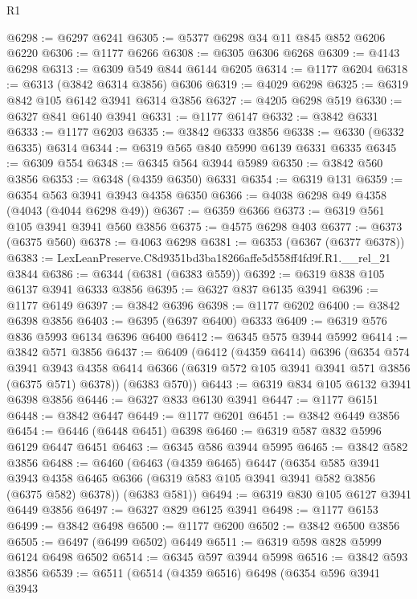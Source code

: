 \begin{lexlean}{R1}
\begin{coremodule}
@6298 := @6297 @6241
@6305 := @5377 @6298 @34 @11 @845 @852 @6206 @6220
@6306 := @1177 @6266
@6308 := @6305 @6306 @6268
@6309 := @4143 @6298
@6313 := @6309 @549 @844 @6144 @6205
@6314 := @1177 @6204
@6318 := @6313 (@3842 @6314 @3856) @6306
@6319 := @4029 @6298
@6325 := @6319 @842 @105 @6142 @3941 @6314 @3856
@6327 := @4205 @6298 @519
@6330 := @6327 @841 @6140 @3941
@6331 := @1177 @6147
@6332 := @3842 @6331
@6333 := @1177 @6203
@6335 := @3842 @6333 @3856
@6338 := @6330 (@6332 @6335) @6314
@6344 := @6319 @565 @840 @5990 @6139 @6331 @6335
@6345 := @6309 @554
@6348 := @6345 @564 @3944 @5989
@6350 := @3842 @560 @3856
@6353 := @6348 (@4359 @6350) @6331
@6354 := @6319 @131
@6359 := @6354 @563 @3941 @3943 @4358 @6350
@6366 := @4038 @6298 @49 @4358 (@4043 (@4044 @6298 @49))
@6367 := @6359 @6366
@6373 := @6319 @561 @105 @3941 @3941 @560 @3856
@6375 := @4575 @6298 @403
@6377 := @6373 (@6375 @560)
@6378 := @4063 @6298
@6381 := @6353 (@6367 (@6377 @6378))
@6383 := LexLeanPreserve.C8d9351bd3ba18266affe5d558ff4fd9f.R1.__rel_21 @3844
@6386 := @6344 (@6381 (@6383 @559))
@6392 := @6319 @838 @105 @6137 @3941 @6333 @3856
@6395 := @6327 @837 @6135 @3941
@6396 := @1177 @6149
@6397 := @3842 @6396
@6398 := @1177 @6202
@6400 := @3842 @6398 @3856
@6403 := @6395 (@6397 @6400) @6333
@6409 := @6319 @576 @836 @5993 @6134 @6396 @6400
@6412 := @6345 @575 @3944 @5992
@6414 := @3842 @571 @3856
@6437 := @6409
    (@6412
      (@4359 @6414)
      @6396
      (@6354
        @574
        @3941
        @3943
        @4358
        @6414
        @6366
        (@6319 @572 @105 @3941 @3941 @571 @3856 (@6375 @571) @6378))
      (@6383 @570))
@6443 := @6319 @834 @105 @6132 @3941 @6398 @3856
@6446 := @6327 @833 @6130 @3941
@6447 := @1177 @6151
@6448 := @3842 @6447
@6449 := @1177 @6201
@6451 := @3842 @6449 @3856
@6454 := @6446 (@6448 @6451) @6398
@6460 := @6319 @587 @832 @5996 @6129 @6447 @6451
@6463 := @6345 @586 @3944 @5995
@6465 := @3842 @582 @3856
@6488 := @6460
    (@6463
      (@4359 @6465)
      @6447
      (@6354
        @585
        @3941
        @3943
        @4358
        @6465
        @6366
        (@6319 @583 @105 @3941 @3941 @582 @3856 (@6375 @582) @6378))
      (@6383 @581))
@6494 := @6319 @830 @105 @6127 @3941 @6449 @3856
@6497 := @6327 @829 @6125 @3941
@6498 := @1177 @6153
@6499 := @3842 @6498
@6500 := @1177 @6200
@6502 := @3842 @6500 @3856
@6505 := @6497 (@6499 @6502) @6449
@6511 := @6319 @598 @828 @5999 @6124 @6498 @6502
@6514 := @6345 @597 @3944 @5998
@6516 := @3842 @593 @3856
@6539 := @6511
    (@6514
      (@4359 @6516)
      @6498
      (@6354
        @596
        @3941
        @3943

\end{coremodule}
\end{lexlean}
